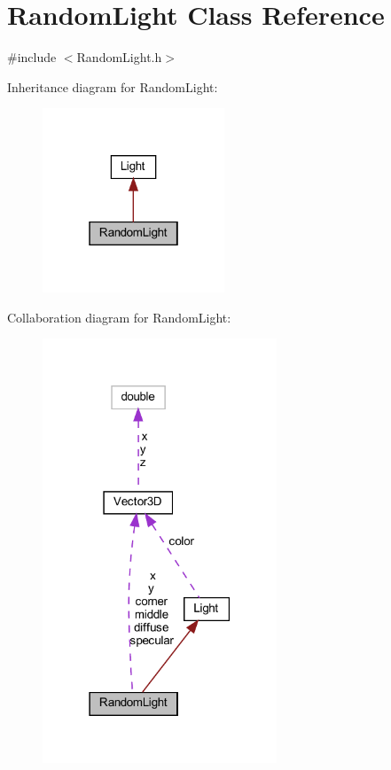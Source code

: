 \hypertarget{classRandomLight}{}\section{Random\+Light Class Reference}
\label{classRandomLight}


{\ttfamily \#include $<$Random\+Light.\+h$>$}



Inheritance diagram for Random\+Light\+:
\nopagebreak
\begin{figure}[H]
\begin{center}
\leavevmode
\includegraphics[width=154pt]{classRandomLight__inherit__graph}
\end{center}
\end{figure}


Collaboration diagram for Random\+Light\+:
\nopagebreak
\begin{figure}[H]
\begin{center}
\leavevmode
\includegraphics[width=198pt]{classRandomLight__coll__graph}
\end{center}
\end{figure}
